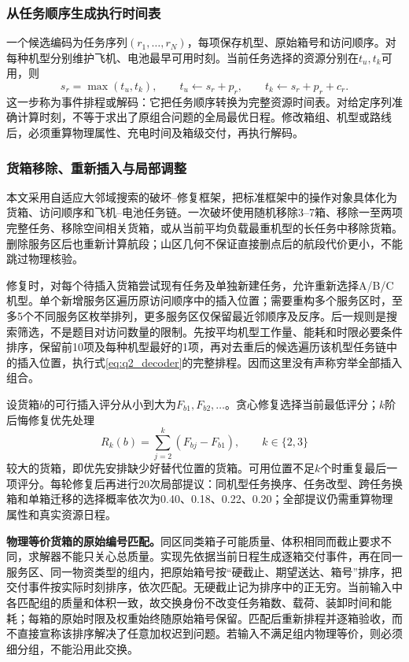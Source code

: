 \documentclass[withoutpreface,colorprint]{format}
\numberwithin{equation}{section}
\numberwithin{figure}{section}
\numberwithin{table}{section}
\begin{document}
\subsubsection{从任务顺序生成执行时间表}
一个候选编码为任务序列$(r_1,\ldots,r_N)$，每项保存机型、原始箱号和访问顺序。对每种机型分别维护飞机、电池最早可用时刻。当前任务选择的资源分别在$t_u,t_k$可用，则
\begin{equation}
 s_r=\max(t_u,t_k),\qquad
 t_u\leftarrow s_r+p_r,\qquad t_k\leftarrow s_r+p_r+c_r.
\label{eq:q2_decoder}
\end{equation}
这一步称为事件排程或解码：它把任务顺序转换为完整资源时间表。对给定序列准确计算时刻，不等于求出了原组合问题的全局最优日程。修改箱组、机型或路线后，必须重算物理属性、充电时间及箱级交付，再执行解码。


\subsubsection{货箱移除、重新插入与局部调整}
本文采用自适应大邻域搜索的破坏--修复框架\cite{ropke2006alns}，把标准框架中的操作对象具体化为货箱、访问顺序和飞机--电池任务链。一次破坏使用随机移除3--7箱、移除一至两项完整任务、移除空间相关货箱，或从当前平均负载最重机型的长任务中移除货箱。删除服务区后也重新计算航段；山区几何不保证直接删点后的航段代价更小，不能跳过物理核验。

修复时，对每个待插入货箱尝试现有任务及单独新建任务，允许重新选择A/B/C机型。单个新增服务区遍历原访问顺序中的插入位置；需要重构多个服务区时，至多5个不同服务区枚举排列，更多服务区仅保留最近邻顺序及反序。后一规则是搜索筛选，不是题目对访问数量的限制。先按平均机型工作量、能耗和时限必要条件排序，保留前10项及每种机型最好的1项，再对去重后的候选遍历该机型任务链中的插入位置，执行式\eqref{eq:q2_decoder}的完整排程。因而这里没有声称穷举全部插入组合。

设货箱$b$的可行插入评分从小到大为$F_{b1},F_{b2},\ldots$。贪心修复选择当前最低评分；$k$阶后悔修复优先处理
\begin{equation}
 R_k(b)=\sum_{j=2}^{k}(F_{bj}-F_{b1}),\qquad k\in\{2,3\}
 \label{eq:q2_regret}
\end{equation}
较大的货箱，即优先安排缺少好替代位置的货箱。可用位置不足$k$个时重复最后一项评分。每轮修复后再进行20次局部提议：同机型任务换序、任务改型、跨任务换箱和单箱迁移的选择概率依次为0.40、0.18、0.22、0.20；全部提议仍需重算物理属性和真实资源日程。

\textbf{物理等价货箱的原始编号匹配。}同区同类箱子可能质量、体积相同而截止要求不同，求解器不能只关心总质量。实现先依据当前日程生成逐箱交付事件，再在同一服务区、同一物资类型的组内，把原始箱号按“硬截止、期望送达、箱号”排序，把交付事件按实际时刻排序，依次匹配。无硬截止记为排序中的正无穷。当前输入中各匹配组的质量和体积一致，故交换身份不改变任务箱数、载荷、装卸时间和能耗；每箱的原始时限及权重始终随原始箱号保留。匹配后重新排程并逐箱验收，而不直接宣称该排序解决了任意加权迟到问题。若输入不满足组内物理等价，则必须细分组，不能沿用此交换。
\end{document}
